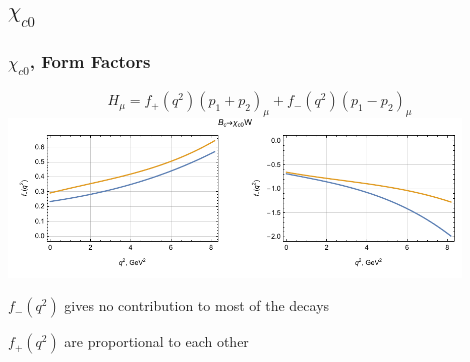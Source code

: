 \documentclass{beamer}
\begin{document}
\subsection{$\chi_{c0}$}
\begin{frame}
  \frametitle{$\chi_{c0}$, Form Factors}
  $$
  H_\mu = f_{+}\left(q^2\right) \left(p_1+p_2\right)_\mu + f_{-}\left(q^2\right) \left(p_1-p_2\right)_\mu 
  $$
  \includegraphics[width=0.9\textwidth]{figs/ff_chi_c0}

  $f_{-}(q^2)$ gives no contribution to most of the decays
  
  $f_{+}(q^2)$ are proportional to each other
\end{frame}

\newcommand{\Br}{\mathrm{Br}}
\end{document}
